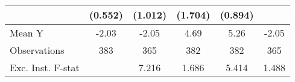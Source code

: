 {\begin{tabular}{l*{5}{c}}
            &     (0.552)         &     (1.012)         &     (1.704)         &     (0.894)         &                     \\
\midrule
Mean Y      &       -2.03         &       -2.05         &        4.69         &        5.26         &       -2.05         \\
Observations&         383         &         365         &         382         &         382         &         365         \\
Exc. Inst. F-stat&                     &       7.216         &       1.686         &       5.414         &       1.488         \\
\bottomrule
\end{tabular}
}
